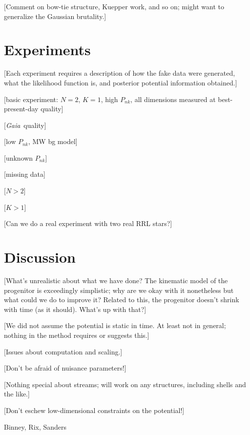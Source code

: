 \documentclass[letterpaper,12pt,preprint]{aastex}
\newcommand{\project}[1]{\textsl{#1}}
\newcommand{\gaia}{\project{Gaia}}
\begin{document}
[Comment on bow-tie structure, Kuepper work, and so on;
  might want to generalize the Gaussian brutality.]

\section{Experiments}

[Each experiment requires a description of how the fake data were
  generated, what the likelihood function is, and posterior potential
  information obtained.]

[basic experiment: $N=2$, $K=1$, high $P_{nk}$, all dimensions
  measured at best-present-day quality]

[\gaia\ quality]

[low $P_{nk}$, MW bg model]

[unknown $P_{nk}$]

[missing data]

[$N>2$]

[$K>1$]

[Can we do a real experiment with two real RRL stars?]

\section{Discussion}

[What's unrealistic about what we have done?  The kinematic model of
  the progenitor is exceedingly simplistic; why are we okay with it
  nonetheless but what could we do to improve it?  Related to this,
  the progenitor doesn't shrink with time (as it should).  What's up
  with that?]

[We did not assume the potential is static in time.  At least not in
  general; nothing in the method requires or suggests this.]

[Issues about computation and scaling.]

[Don't be afraid of nuisance parameters!]

[Nothing special about streams; will work on any structures, including
  shells and the like.]

[Don't eschew low-dimensional constraints on the potential!]

\acknowledgements
Binney, Rix, Sanders
\end{document}
